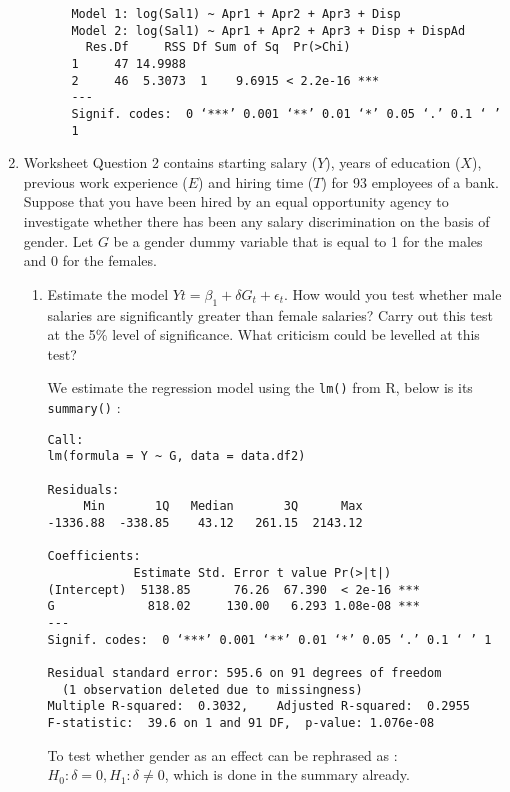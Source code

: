 \documentclass[12pt]{article}
\begin{document}
\begin{enumerate}
\begin{enumerate}
\begin{enumerate}
\begin{Answer}
\begin{verbatim}
Model 1: log(Sal1) ~ Apr1 + Apr2 + Apr3 + Disp
Model 2: log(Sal1) ~ Apr1 + Apr2 + Apr3 + Disp + DispAd
  Res.Df     RSS Df Sum of Sq  Pr(>Chi)    
1     47 14.9988                           
2     46  5.3073  1    9.6915 < 2.2e-16 ***
---
Signif. codes:  0 ‘***’ 0.001 ‘**’ 0.01 ‘*’ 0.05 ‘.’ 0.1 ‘ ’ 1
\end{verbatim}
\end{Answer}
\end{enumerate}
\end{enumerate}

\item Worksheet Question 2 contains starting salary ($Y$), years of education ($X$), previous work experience ($E$) and hiring time ($T$) for 93 employees of a bank. Suppose that you have been hired by an equal opportunity agency to investigate whether there has been any salary discrimination on the basis of gender. Let $G$ be a gender dummy variable that is equal to 1 for the males and 0 for the females.\\
\begin{enumerate}
\item Estimate the model $Yt = \beta_1 + \delta G_t + \epsilon_t$. How would you test whether male salaries are significantly greater than female salaries? Carry out this test at the 5\% level of significance. What criticism could be levelled at this test?\\
\begin{Answer}

We estimate the regression model using the \verb|lm()| from R, below is its \verb|summary()| :

\begin{verbatim}
Call:
lm(formula = Y ~ G, data = data.df2)

Residuals:
     Min       1Q   Median       3Q      Max 
-1336.88  -338.85    43.12   261.15  2143.12 

Coefficients:
            Estimate Std. Error t value Pr(>|t|)    
(Intercept)  5138.85      76.26  67.390  < 2e-16 ***
G             818.02     130.00   6.293 1.08e-08 ***
---
Signif. codes:  0 ‘***’ 0.001 ‘**’ 0.01 ‘*’ 0.05 ‘.’ 0.1 ‘ ’ 1

Residual standard error: 595.6 on 91 degrees of freedom
  (1 observation deleted due to missingness)
Multiple R-squared:  0.3032,	Adjusted R-squared:  0.2955 
F-statistic:  39.6 on 1 and 91 DF,  p-value: 1.076e-08
\end{verbatim}

To test whether gender as an effect can be rephrased as : $H_0:\delta = 0, H_1:\delta\ne0$, which is done in the summary already.


\end{Answer}
\end{enumerate}
\end{enumerate}
\end{document}

